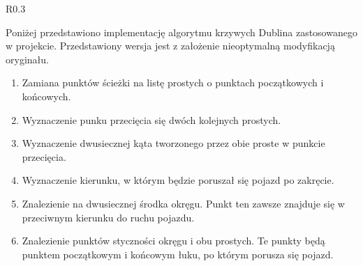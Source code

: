             \begin{wrapfigure}[3]{R}{0.3\textwidth}
                \centering
                \vspace{1cm}
            \end{wrapfigure}

\newpage
            Poniżej przedstawiono implementację algorytmu krzywych Dublina zastosowanego w projekcie.
            Przedstawiony wersja jest z założenie nieoptymalną modyfikacją oryginału.

            \vspace{0.25cm}
            \begin{minipage}[l]{0.6\textwidth}
                \begin{enumerate}
                    \item Zamiana punktów ścieżki na listę prostych o punktach początkowych i końcowych.
                    \item Wyznaczenie punku przecięcia się dwóch kolejnych prostych.
                    \item Wyznaczenie dwusiecznej kąta tworzonego przez obie proste w punkcie przecięcia.
                    \item Wyznaczenie kierunku, w którym będzie poruszał się pojazd po zakręcie.
                    \item Znalezienie na dwusiecznej środka okręgu. Punkt ten zawsze znajduje się w przeciwnym kierunku do ruchu pojazdu.
                    \item Znalezienie punktów styczności okręgu i obu prostych. Te punkty będą punktem początkowym i końcowym łuku, po którym porusza się pojazd.
                \end{enumerate}
            \end{minipage}
            \vspace{0.25cm}

